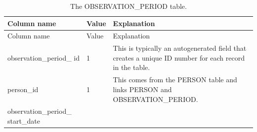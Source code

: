 \documentclass[11pt]{book}
\theoremstyle{definition}
\theoremstyle{definition}
\theoremstyle{definition}
\theoremstyle{remark}
\begin{document}
\begin{longtable}[]{@{}lll@{}}
\caption{\label{tab:observationPeriod} The OBSERVATION\_PERIOD table.}\tabularnewline
\toprule
\begin{minipage}[b]{0.28\columnwidth}\raggedright
Column name\strut
\end{minipage} & \begin{minipage}[b]{0.15\columnwidth}\raggedright
Value\strut
\end{minipage} & \begin{minipage}[b]{0.49\columnwidth}\raggedright
Explanation\strut
\end{minipage}\tabularnewline
\midrule
\endfirsthead
\toprule
\begin{minipage}[b]{0.28\columnwidth}\raggedright
Column name\strut
\end{minipage} & \begin{minipage}[b]{0.15\columnwidth}\raggedright
Value\strut
\end{minipage} & \begin{minipage}[b]{0.49\columnwidth}\raggedright
Explanation\strut
\end{minipage}\tabularnewline
\midrule
\endhead
\begin{minipage}[t]{0.28\columnwidth}\raggedright
observation\_period\_ id\strut
\end{minipage} & \begin{minipage}[t]{0.15\columnwidth}\raggedright
1\strut
\end{minipage} & \begin{minipage}[t]{0.49\columnwidth}\raggedright
This is typically an autogenerated field that creates a unique ID number for each record in the table.\strut
\end{minipage}\tabularnewline
\begin{minipage}[t]{0.28\columnwidth}\raggedright
person\_id\strut
\end{minipage} & \begin{minipage}[t]{0.15\columnwidth}\raggedright
1\strut
\end{minipage} & \begin{minipage}[t]{0.49\columnwidth}\raggedright
This comes from the PERSON table and links PERSON and OBSERVATION\_PERIOD.\strut
\end{minipage}\tabularnewline
\begin{minipage}[t]{0.28\columnwidth}\raggedright
observation\_period\_ start\_date\strut
\end{minipage} & \begin{minipage}[t]{0.15\columnwidth}\raggedright

\end{minipage}
\end{longtable}
\end{document}
